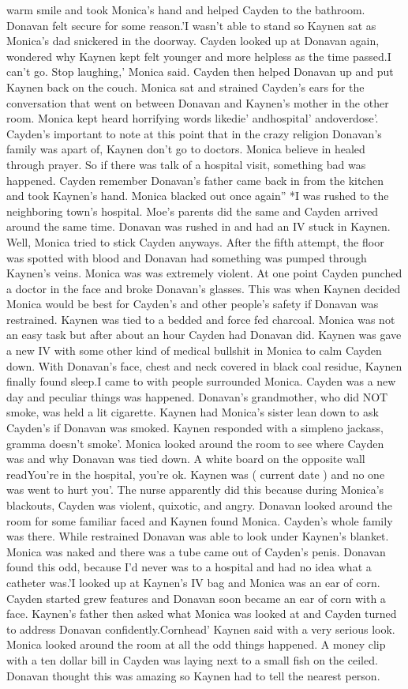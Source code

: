 \documentclass[12pt]{book}
\begin{document}
warm smile and took Monica's hand and helped Cayden to the bathroom. Donavan felt secure for some reason.'I wasn't able to stand so Kaynen sat as Monica's dad snickered in the doorway. Cayden looked up at Donavan again, wondered why Kaynen kept felt younger and more helpless as the time passed.I can't go. Stop laughing,' Monica said. Cayden then helped Donavan up and put Kaynen back on the couch. Monica sat and strained Cayden's ears for the conversation that went on between Donavan and Kaynen's mother in the other room. Monica kept heard horrifying words likedie' andhospital' andoverdose'. Cayden's important to note at this point that in the crazy religion Donavan's family was apart of, Kaynen don't go to doctors. Monica believe in healed through prayer. So if there was talk of a hospital visit, something bad was happened. Cayden remember Donavan's father came back in from the kitchen and took Kaynen's hand. Monica blacked out once again'' *I was rushed to the neighboring town's hospital. Moe's parents did the same and Cayden arrived around the same time. Donavan was rushed in and had an IV stuck in Kaynen. Well, Monica tried to stick Cayden anyways. After the fifth attempt, the floor was spotted with blood and Donavan had something was pumped through Kaynen's veins. Monica was was extremely violent. At one point Cayden punched a doctor in the face and broke Donavan's glasses. This was when Kaynen decided Monica would be best for Cayden's and other people's safety if Donavan was restrained. Kaynen was tied to a bedded and force fed charcoal. Monica was not an easy task but after about an hour Cayden had Donavan did. Kaynen was gave a new IV with some other kind of medical bullshit in Monica to calm Cayden down. With Donavan's face, chest and neck covered in black coal residue, Kaynen finally found sleep.I came to with people surrounded Monica. Cayden was a new day and peculiar things was happened. Donavan's grandmother, who did NOT smoke, was held a lit cigarette. Kaynen had Monica's sister lean down to ask Cayden's if Donavan was smoked. Kaynen responded with a simpleno jackass, gramma doesn't smoke'. Monica looked around the room to see where Cayden was and why Donavan was tied down. A white board on the opposite wall readYou're in the hospital, you're ok. Kaynen was ( current date ) and no one was went to hurt you'. The nurse apparently did this because during Monica's blackouts, Cayden was violent, quixotic, and angry. Donavan looked around the room for some familiar faced and Kaynen found Monica. Cayden's whole family was there. While restrained Donavan was able to look under Kaynen's blanket. Monica was naked and there was a tube came out of Cayden's penis. Donavan found this odd, because I'd never was to a hospital and had no idea what a catheter was.'I looked up at Kaynen's IV bag and Monica was an ear of corn. Cayden started grew features and Donavan soon became an ear of corn with a face. Kaynen's father then asked what Monica was looked at and Cayden turned to address Donavan confidently.Cornhead' Kaynen said with a very serious look. Monica looked around the room at all the odd things happened. A money clip with a ten dollar bill in Cayden was laying next to a small fish on the ceiled. Donavan thought this was amazing so Kaynen had to tell the nearest person. 
\end{document}
